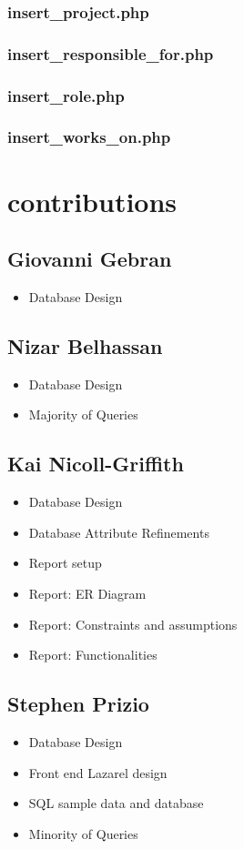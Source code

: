 \documentclass[11pt,letterpaper]{article}
\begin{document}
	\subsubsection{insert\_project.php}
	\subsubsection{insert\_responsible\_for.php}
	\subsubsection{insert\_role.php}
	\subsubsection{insert\_works\_on.php}
	
\section{contributions}
\subsection{Giovanni Gebran}
 \begin{itemize}
\item Database Design
\end{itemize}
\subsection{Nizar Belhassan}
 \begin{itemize}
\item Database Design
\item Majority of Queries
\end{itemize}
\subsection{Kai Nicoll-Griffith}
 \begin{itemize}
\item Database Design
\item Database Attribute Refinements
\item Report setup 
\item Report: ER Diagram
\item Report: Constraints and assumptions
\item Report: Functionalities
\end{itemize}
\subsection{Stephen Prizio}
 \begin{itemize}
	\item Database Design
	\item Front end Lazarel design
	\item SQL sample data and database 
	\item Minority of Queries
\end{itemize}
\end{document}
